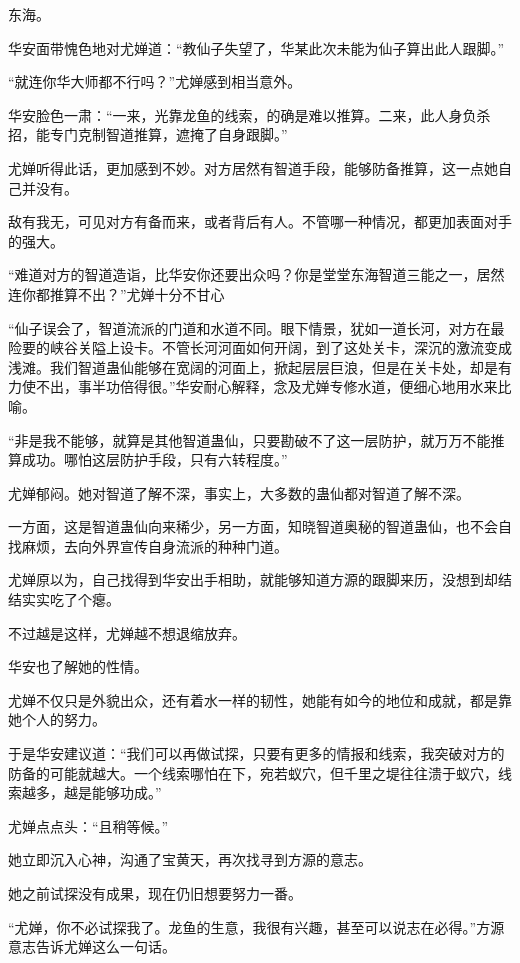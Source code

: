 \begin{this_body}
东海。

华安面带愧色地对尤婵道：“教仙子失望了，华某此次未能为仙子算出此人跟脚。”

“就连你华大师都不行吗？”尤婵感到相当意外。

华安脸色一肃：“一来，光靠龙鱼的线索，的确是难以推算。二来，此人身负杀招，能专门克制智道推算，遮掩了自身跟脚。”

尤婵听得此话，更加感到不妙。对方居然有智道手段，能够防备推算，这一点她自己并没有。

敌有我无，可见对方有备而来，或者背后有人。不管哪一种情况，都更加表面对手的强大。

“难道对方的智道造诣，比华安你还要出众吗？你是堂堂东海智道三能之一，居然连你都推算不出？”尤婵十分不甘心

“仙子误会了，智道流派的门道和水道不同。眼下情景，犹如一道长河，对方在最险要的峡谷关隘上设卡。不管长河河面如何开阔，到了这处关卡，深沉的激流变成浅滩。我们智道蛊仙能够在宽阔的河面上，掀起层层巨浪，但是在关卡处，却是有力使不出，事半功倍得很。”华安耐心解释，念及尤婵专修水道，便细心地用水来比喻。

“非是我不能够，就算是其他智道蛊仙，只要勘破不了这一层防护，就万万不能推算成功。哪怕这层防护手段，只有六转程度。”

尤婵郁闷。她对智道了解不深，事实上，大多数的蛊仙都对智道了解不深。

一方面，这是智道蛊仙向来稀少，另一方面，知晓智道奥秘的智道蛊仙，也不会自找麻烦，去向外界宣传自身流派的种种门道。

尤婵原以为，自己找得到华安出手相助，就能够知道方源的跟脚来历，没想到却结结实实吃了个瘪。

不过越是这样，尤婵越不想退缩放弃。

华安也了解她的性情。

尤婵不仅只是外貌出众，还有着水一样的韧性，她能有如今的地位和成就，都是靠她个人的努力。

于是华安建议道：“我们可以再做试探，只要有更多的情报和线索，我突破对方的防备的可能就越大。一个线索哪怕在下，宛若蚁穴，但千里之堤往往溃于蚁穴，线索越多，越是能够功成。”

尤婵点点头：“且稍等候。”

她立即沉入心神，沟通了宝黄天，再次找寻到方源的意志。

她之前试探没有成果，现在仍旧想要努力一番。

“尤婵，你不必试探我了。龙鱼的生意，我很有兴趣，甚至可以说志在必得。”方源意志告诉尤婵这么一句话。


\end{this_body}
